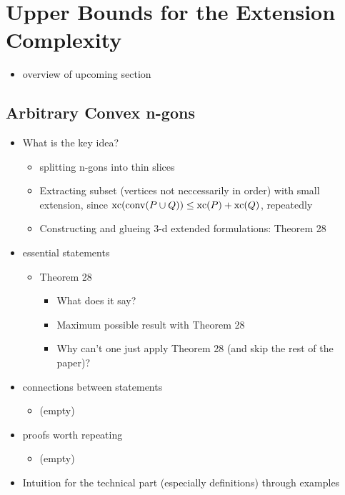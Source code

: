 \section{Upper Bounds for the Extension Complexity}

\begin{itemize}
  \item overview of upcoming section
\end{itemize}



\subsection{Arbitrary Convex n-gons}

\begin{itemize}
  \item What is the key idea? 
  \begin{itemize}
    \item splitting n-gons into thin slices
    \item Extracting subset (vertices not neccessarily in order) with small extension, since $\operatorname{xc}(\operatorname{conv}(P \cup Q)) \leq \operatorname{xc}(P) + \operatorname{xc}(Q)$, repeatedly
    \item Constructing and glueing 3-d extended formulations: Theorem 28
  \end{itemize}
  \item essential statements
  \begin{itemize}
    \item Theorem 28
    \begin{itemize}
      \item What does it say?
      \item Maximum possible result with Theorem 28
      \item Why can't one just apply Theorem 28 (and skip the rest of the paper)?
    \end{itemize}
  \end{itemize}
  \item connections between statements
  \begin{itemize}
    \item (empty)
  \end{itemize}
  \item proofs worth repeating
  \begin{itemize}
    \item (empty)
  \end{itemize}
  \item Intuition for the technical part (especially definitions) through examples
\end{itemize}

